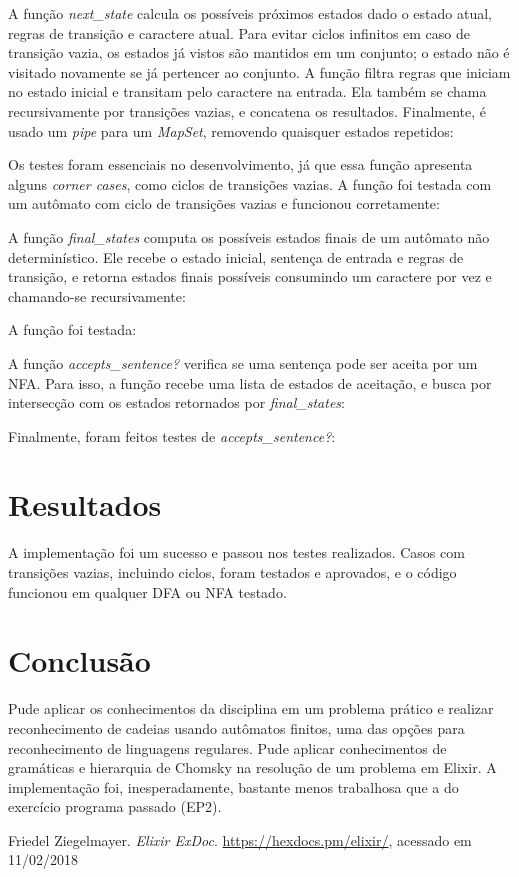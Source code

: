 \documentclass[conference]{IEEEtran}
\begin{document}
A função \emph{next\_state} calcula os possíveis próximos estados dado o estado atual, regras de transição e caractere atual. Para evitar ciclos infinitos em caso de transição vazia, os estados já vistos são mantidos em um conjunto; o estado não é visitado novamente se já pertencer ao conjunto. A função filtra regras que iniciam no estado inicial e transitam pelo caractere na entrada. Ela também se chama recursivamente por transições vazias, e concatena os resultados. Finalmente, é usado um \emph{pipe} para um \emph{MapSet}, removendo quaisquer estados repetidos:



Os testes foram essenciais no desenvolvimento, já que essa função apresenta alguns \emph{corner cases}, como ciclos de transições vazias. A função foi testada com um autômato com ciclo de transições vazias e funcionou corretamente:



A função \emph{final\_states} computa os possíveis estados finais de um autômato não determinístico. Ele recebe o estado inicial, sentença de entrada e regras de transição, e retorna estados finais possíveis consumindo um caractere por vez e chamando-se recursivamente:



A função foi testada:



A função \emph{accepts\_sentence?} verifica se uma sentença pode ser aceita por um NFA. Para isso, a função recebe uma lista de estados de aceitação, e busca por intersecção com os estados retornados por \emph{final\_states}:



Finalmente, foram feitos testes de \emph{accepts\_sentence?}:



\section{Resultados}

A implementação foi um sucesso e passou nos testes realizados. Casos com transições vazias, incluindo ciclos, foram testados e aprovados, e o código funcionou em qualquer DFA ou NFA testado.

\section{Conclusão}

Pude aplicar os conhecimentos da disciplina em um problema prático e realizar reconhecimento de cadeias usando autômatos finitos, uma das opções para reconhecimento de linguagens regulares. Pude aplicar conhecimentos de gramáticas e hierarquia de Chomsky na resolução de um problema em Elixir. A implementação foi, inesperadamente, bastante menos trabalhosa que a do exercício programa passado (EP2).

\begin{thebibliography}{1}
Friedel Ziegelmayer. \emph{Elixir ExDoc}. \url{https://hexdocs.pm/elixir/}, acessado em 11/02/2018
\end{thebibliography}
\end{document}
